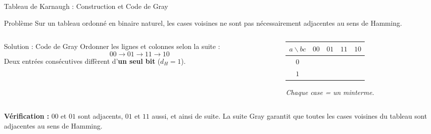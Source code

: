 \begin{frame}{Tableau de Karnaugh : Construction et Code de Gray}

    \begin{block}{Problème}
        Sur un tableau ordonné en binaire naturel, les cases voisines ne sont pas nécessairement adjacentes au sens de Hamming.
    \end{block}

    \vspace{0.3cm}

    \begin{columns}[T]
        \begin{column}{0.5\textwidth}
            \begin{alertblock}{Solution : Code de Gray}
                Ordonner les lignes et colonnes selon la suite :
                \[
                    00 \to 01 \to 11 \to 10
                \]
                Deux entrées consécutives diffèrent d'\textbf{un seul bit} (\(d_H = 1\)).
            \end{alertblock}
        \end{column}
        \begin{column}{0.45\textwidth}
            \centering
            \renewcommand{\arraystretch}{1.4}
            \begin{tabular}{|c|c|c|c|c|}
                \hline
                \(a \backslash bc\) & \(00\) & \(01\) & \textbf{\(11\)} & \(10\) \\
                \hline
                \(0\) & ~ & ~ & ~ & ~ \\
                \hline
                \(1\) & ~ & ~ & ~ & ~ \\
                \hline
            \end{tabular}

            \vspace{0.3cm}
            \textit{Chaque case = un minterme.}
        \end{column}
    \end{columns}

    \vspace{0.3cm}

    \textbf{Vérification :} \(00\) et \(01\) sont adjacents, \(01\) et \(11\) aussi, et ainsi de suite. La suite Gray garantit que toutes les cases voisines du tableau sont adjacentes au sens de Hamming.

\end{frame}

